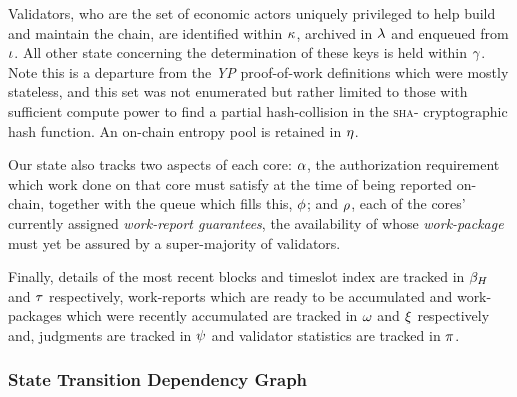 Validators, who are the set of economic actors uniquely privileged to help build and maintain the \Jam chain, are identified within $\kappa$, archived in $\lambda$ and enqueued from $\iota$. All other state concerning the determination of these keys is held within $\gamma$. Note this is a departure from the \emph{YP} proof-of-work definitions which were mostly stateless, and this set was not enumerated but rather limited to those with sufficient compute power to find a partial hash-collision in the \textsc{sha}- cryptographic hash function. An on-chain entropy pool is retained in $\eta$.

Our state also tracks two aspects of each core: $\alpha$, the authorization requirement which work done on that core must satisfy at the time of being reported on-chain, together with the queue which fills this, $\phi$; and $\rho$, each of the cores' currently assigned \emph{work-report guarantees}, the availability of whose \emph{work-package} must yet be assured by a super-majority of validators.

Finally, details of the most recent blocks and timeslot index are tracked in $\beta_H$ and $\tau$ respectively, work-reports which are ready to be accumulated and work-packages which were recently accumulated are tracked in $\omega$ and $\xi$ respectively and, judgments are tracked in $\psi$ and validator statistics are tracked in $\pi$.

\subsubsection{State Transition Dependency Graph}

